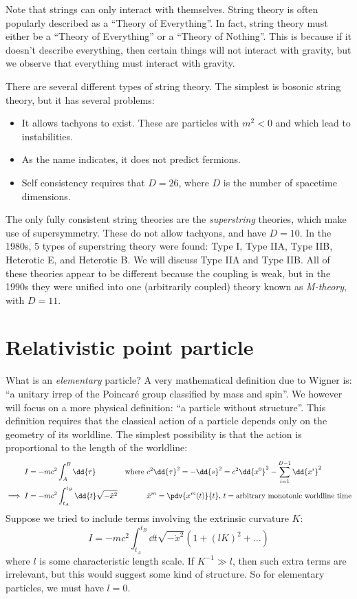 \documentclass{jknotes}
\begin{document}
Note that strings can only interact with themselves. String theory is often popularly described as a ``Theory of Everything''. In fact, string theory must either be a ``Theory of Everything'' or a ``Theory of Nothing''. This is because if it doesn't describe everything, then certain things will not interact with gravity, but we observe that everything must interact with gravity.

There are several different types of string theory. The simplest is bosonic string theory, but it has several problems:
\begin{itemize}
    \item It allows tachyons to exist. These are particles with \(m^2 < 0\) and which lead to instabilities.
    \item As the name indicates, it does not predict fermions.
    \item Self consistency requires that \(D=26\), where \(D\) is the number of spacetime dimensions.
\end{itemize}

The only fully consistent string theories are the \emph{superstring} theories, which make use of supersymmetry. These do not allow tachyons, and have \(D=10\). In the 1980s, 5 types of superstring theory were found: Type I, Type IIA, Type IIB, Heterotic E, and Heterotic B. We will discuss Type IIA and Type IIB. All of these theories appear to be different because the coupling is weak, but in the 1990s they were unified into one (arbitrarily coupled) theory
known as \emph{M-theory}, with \(D=11\).

\section{Relativistic point particle}

What is an \emph{elementary} particle? A very mathematical definition due to Wigner is: ``a unitary irrep of the Poincar\'e group classified by mass and spin''. We however will focus on a more physical definition: ``a particle without structure''. This definition requires that the classical action of a particle depends only on the geometry of its worldline. The simplest possibility is that the action is proportional to the length of the worldline:
\begin{align}
    I &= -mc^2 \int_A^B \dd{\tau} & \text{where } & c^2\dd{\tau}^2 = -\dd{s}^2 = c^2\dd{x^0}^2 - \sum_{i=1}^{D-1}\dd{x^i}^2 \\
    \implies I &= -mc^2 \int_{t_A}^{t_B} \dd{t}\sqrt{-\dot{x}^2} && \dot{x}^m = \pdv{x^m(t)}{t},\,t = \text{arbitrary monotonic worldline time}
\end{align}
Suppose we tried to include terms involving the extrinsic curvature \(K\):
\begin{equation}
    I = -mc^2 \int_{t_A}^{t_B}\dd{t}\sqrt{-\dot{x}^2}\left( 1 + (lK)^2 + \dots \right)
\end{equation}
where \(l\) is some characteristic length scale. If \(K^{-1}\gg l\), then such extra terms are irrelevant, but this would suggest some kind of structure. So for elementary particles, we must have \(l=0\).
\end{document}
